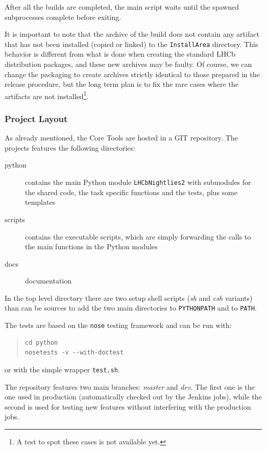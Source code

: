 \documentclass{lhcbnote}
\begin{document}
After all the builds are completed, the main script waits until the spawned
subprocesses complete before exiting.

It is important to note that the archive of the build does not contain any
artifact that has not been installed (copied or linked) to the
\texttt{InstallArea} directory.  This behavior is different from what is done
when creating the standard LHCb distribution packages, and these new archives
may be faulty. Of course, we can change the packaging to create archives
strictly identical to those prepared in the release procedure, but the long term
plan is to fix the rare cases where the artifacts are not installed\footnote{A
test to spot these cases is not available yet.}.

\subsubsection{Project Layout}
As already mentioned, the Core Tools are hosted in a GIT repository.  The
projects features the following directories:
\begin{description}
  \item[python] contains the main Python module \texttt{LHCbNightlies2} with
submodules for the shared code, the task specific functions and the tests, plus
some templates
  \item[scripts] contains the executable scripts, which are simply forwarding
the calls to the main functions in the Python modules
  \item[docs] documentation
\end{description}
In the top level directory there are two setup shell scripts (\emph{sh} and
\emph{csh} variants) than can be sources to add the two main directories to
\texttt{PYTHONPATH} and to \texttt{PATH}.

The tests are based on the \texttt{nose} testing framework\cite{nose} and can be
run with:
\begin{quote}
\begin{verbatim}
cd python
nosetests -v --with-doctest
\end{verbatim}
\end{quote}
or with the simple wrapper \texttt{test.sh}.

The repository features two main branches: \emph{master} and \emph{dev}.  The
first one is the one used in production (automatically checked out by the
Jenkins jobs), while the second is used for testing new features without
interfering with the production jobs.
\end{document}
